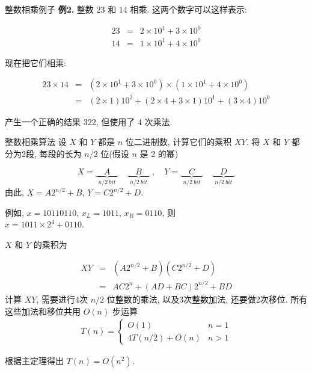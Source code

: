 \documentclass[fontset=fandol,UTF8,fleqn]{beamer}
\begin{document}
\begin{frame}{整数相乘例子}
\textbf{例2.} 整数 $23$ 和 $14$ 相乘. 这两个数字可以这样表示:
\begin{exampleblock}{}  
 \begin{eqnarray*}
      23 & = & 2\times 10^1 + 3\times 10^0\\
     14 & = & 1\times 10^1 + 4\times 10^0 
 \end{eqnarray*}
\end{exampleblock}
现在把它们相乘: 
\begin{exampleblock}{}
   \begin{eqnarray*}
   23 \times 14 &  = & (2\times 10^1 + 3\times 10^0) \times (1\times 10^1 + 4\times 10^0)   \\
 & = & (2\times 1)10^2+(2\times 4+3\times 1)10^1+(3\times 4)10^0 
   \end{eqnarray*}
 \end{exampleblock}
 产生一个正确的结果 $322$, 但使用了 $4$ 次乘法.  
\end{frame}

\begin{frame}{整数相乘算法}
设 $X$ 和 $Y$ 都是 $n$ 位二进制数, 计算它们的乘积 $XY$.  将 $X$ 和 $Y$
都分为2段, 每段的长为 $n/2$ 位(假设 $n$ 是 2 的幂)
\begin{exampleblock}{}
  \begin{displaymath}
X=\underbrace{  \quad A \quad }_{n/2\ bit} \quad \underbrace{  \quad B \quad }_{n/2\ bit}\ ,  \quad Y=\underbrace{  \quad C \quad }_{n/2\ bit} \quad \underbrace{  \quad D \quad }_{n/2\ bit} 
\end{displaymath}
由此,  $X = A 2^{n/2} + B$, $Y = C 2^{n/2} + D$.   

例如, $x = 10110110$, $x_L = 1011$, $x_R = 0110$, 则   \\
$x = 1011\times 2^4 + 0110$. 
\end{exampleblock}
\end{frame}

\begin{frame}{}
  $X$ 和 $Y$ 的乘积为
  \begin{exampleblock}{}
    \begin{eqnarray*}
  XY & = & (A 2^{n/2} + B)(C 2^{n/2} + D)\\
& = & AC2^n+(AD+BC)2^{n/2}+BD
\end{eqnarray*}
计算 $XY$, 需要进行4次 $n/2$ 位整数的乘法,  以及3次整数加法, 还要做2次移位. 所有这些加法和移位共用 $O(n)$ 步运算  
\begin{eqnarray*}
  T(n) = \left\{\begin{array}{ll} 
O(1) & n = 1     \\
4T(n/2)+O(n) & n > 1  
\end{array} \right. 
\end{eqnarray*}
\end{exampleblock}
根据主定理得出 $T(n)=O(n^2)$.  
\end{frame}
\end{document}
